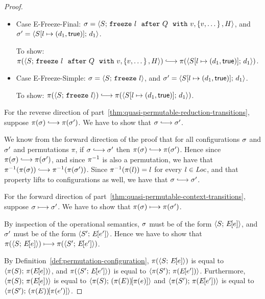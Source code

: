 \begin{proof}
\begin{itemize}
    \item Case {\sc E-Freeze-Final}: $\sigma =
      \langle S;\, \mbox{\texttt{freeze}}~l~~{\mbox{\texttt{after}}}~Q~~{\mbox{\texttt{with}}}~v, \left\{v, \dots\right\}, H \rangle$, and
      $\sigma' = \langle S[l \mapsto (d_1, \textsf{true})];\, d_1 \rangle$.

      To show: $\pi(\config{S}{\freezeafterfull{l}{Q}{v}{\setof{v,
            \dots}}{H}}) \parstepsto
      \pi(\config{\extS{S}{l}{d_1}{\frozentrue}}{d_1})$.

    \item Case {\sc E-Freeze-Simple}: $\sigma =
      \langle S;\, \mbox{\texttt{freeze}}~l \rangle$, and $\sigma' =
      \langle S[l \mapsto (d_1, \textsf{true})];\, d_1 \rangle$.

      To show: $\pi(\config{S}{\freeze{l}}) \parstepsto
      \pi(\config{\extS{S}{l}{d_1}{\frozentrue}}{d_1})$.

  \end{itemize}

  For the reverse direction of
  part~\ref{thm:quasi-permutable-reduction-transitions}, suppose
  $\pi(\conf) \parstepsto \pi(\conf')$.  We have to show that $\conf
  \parstepsto \conf'$.

  We know from the forward direction of the proof that for all
  configurations $\sigma$ and $\sigma'$ and permutations $\pi$, if
  $\conf \parstepsto \conf'$ then $\pi(\conf) \parstepsto
  \pi(\conf')$.  Hence since $\pi(\conf) \parstepsto \pi(\conf')$, and
  since $\pi^{-1}$ is also a permutation, we have that
  $\piinv(\pi(\conf)) \parstepsto \piinv(\pi(\conf'))$.  Since
  $\pi^{-1}(\pi(l)) = l$ for every $l \in \mathit{Loc}$, and that property lifts
  to configurations as well, we have that $\conf \parstepsto \conf'$.


  For the forward direction of
  part~\ref{thm:quasi-permutable-context-transitions}, suppose $\sigma
  \longmapsto \sigma'$.  We have to show that $\pi(\sigma) \longmapsto
  \pi(\sigma')$.

  By inspection of the operational semantics, $\sigma$ must be of the
  form $\langle S;\, E\hspace{-1mm}\left[e\right] \rangle$, and $\sigma'$ must be of the form
  $\langle S';\, E\hspace{-1mm}\left[e'\right] \rangle$.  Hence we have to show that
  $\pi(\langle S;\, E\hspace{-1mm}\left[e\right] \rangle) \longmapsto \pi(\langle S';\, E\hspace{-1mm}\left[e'\right] \rangle)$.

  By Definition~\ref{def:permutation-configuration},
  $\pi(\langle S;\, E\hspace{-1mm}\left[e\right] \rangle)$ is equal to $\langle \pi(S);\, \pi(E\hspace{-1mm}\left[e\right]) \rangle$,
  and $\pi(\langle S';\, E\hspace{-1mm}\left[e'\right] \rangle)$ is equal to
  $\langle \pi(S');\, \pi(E\hspace{-1mm}\left[e'\right]) \rangle$.  Furthermore,
  $\langle \pi(S);\, \pi(E\hspace{-1mm}\left[e\right]) \rangle$ is equal to
  $\langle \pi(S);\, (\pi(E))\hspace{-1mm}\left[\pi(e)\right] \rangle$ and
  $\langle \pi(S');\, \pi(E\hspace{-1mm}\left[e'\right]) \rangle$ is equal to
  $\langle \pi(S');\, (\pi(E))\hspace{-1mm}\left[\pi(e')\right] \rangle$.


\end{proof}
